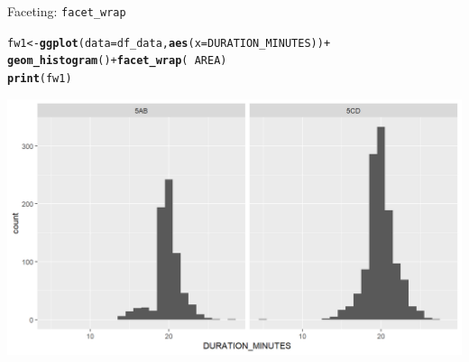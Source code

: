 \documentclass{beamer}\usepackage[]{graphicx}\usepackage[]{color}
\makeatletter
\newcommand{\hlopt}[1]{\textcolor[rgb]{0,0,0}{#1}}%
\newcommand{\hlstd}[1]{\textcolor[rgb]{0.345,0.345,0.345}{#1}}%
\newcommand{\hlkwb}[1]{\textcolor[rgb]{0.69,0.353,0.396}{#1}}%
\newcommand{\hlkwc}[1]{\textcolor[rgb]{0.333,0.667,0.333}{#1}}%
\newcommand{\hlkwd}[1]{\textcolor[rgb]{0.737,0.353,0.396}{\textbf{#1}}}%
\newenvironment{kframe}{%
 \def\at@end@of@kframe{}%
 \ifinner\ifhmode%
  \def\at@end@of@kframe{\end{minipage}}%
  \begin{minipage}{\columnwidth}%
 \fi\fi%
 \def\FrameCommand##1{\hskip\@totalleftmargin \hskip-\fboxsep
 \colorbox{shadecolor}{##1}\hskip-\fboxsep
     \hskip-\linewidth \hskip-\@totalleftmargin \hskip\columnwidth}%
 \MakeFramed {\advance\hsize-\width
   \@totalleftmargin\z@ \linewidth\hsize
   \@setminipage}}%
 {\par\unskip\endMakeFramed%
 \at@end@of@kframe}
\newenvironment{knitrout}{}{} %
\makeatother
\begin{document}
\begin{frame}[fragile]{Faceting: \lstinline{facet_wrap}}
\begin{knitrout}\footnotesize
{}\color{fgcolor}\begin{kframe}
\begin{alltt}
\hlstd{fw1} \hlkwb{<-} \hlkwd{ggplot}\hlstd{(}\hlkwc{data}\hlstd{=df_data,} \hlkwd{aes}\hlstd{(}\hlkwc{x}\hlstd{=DURATION_MINUTES))} \hlopt{+}
  \hlkwd{geom_histogram}\hlstd{()} \hlopt{+} \hlkwd{facet_wrap}\hlstd{(}\hlopt{~} \hlstd{AREA)}
\hlkwd{print}\hlstd{(fw1)}
\end{alltt}


{\ttfamily\noindent\itshape\color{messagecolor}{\#\# `stat\_bin()` using `bins = 30`. Pick better value with `binwidth`.}}\end{kframe}

{\centering \includegraphics[width=.9\linewidth]{figure/facet_wrap_1-1} 

}



\end{knitrout}
\end{frame}
\end{document}
